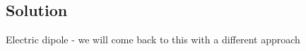 \documentclass[solutions]{esg8022pset}
\begin{document}
\subsection{Solution}
  Electric dipole - we will come back to this with a different approach

\end{document}
